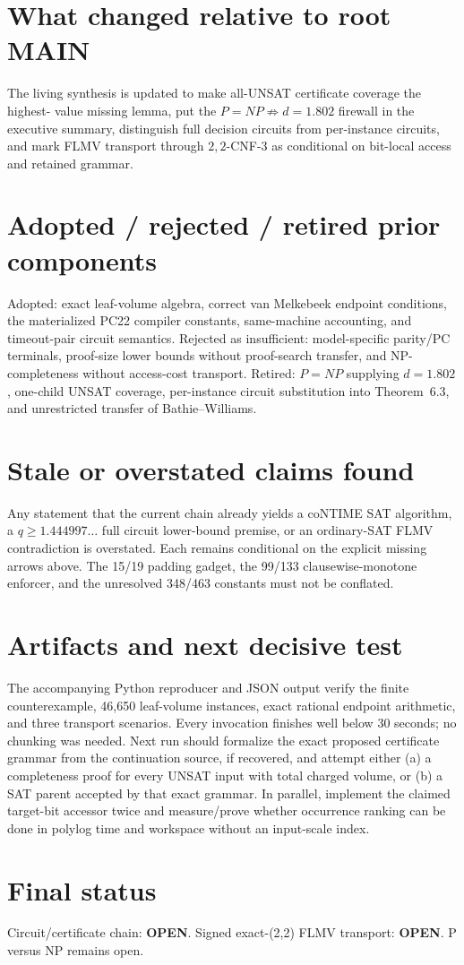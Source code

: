 \documentclass[11pt]{article}
\newcommand{\openstatus}{\textbf{OPEN}}
\begin{document}
\section*{What changed relative to root MAIN}
The living synthesis is updated to make all-UNSAT certificate coverage the highest-
value missing lemma, put the $P=NP\not\Rightarrow d=1.802$ firewall in the executive
summary, distinguish full decision circuits from per-instance circuits, and mark FLMV
transport through $2,2$-CNF-3 as conditional on bit-local access and retained grammar.

\section*{Adopted / rejected / retired prior components}
Adopted: exact leaf-volume algebra, correct van Melkebeek endpoint conditions, the
materialized PC22 compiler constants, same-machine accounting, and timeout-pair circuit
semantics.  Rejected as insufficient: model-specific parity/PC terminals, proof-size
lower bounds without proof-search transfer, and NP-completeness without access-cost
transport.  Retired: $P=NP$ supplying $d=1.802$, one-child UNSAT coverage, per-instance
circuit substitution into Theorem~6.3, and unrestricted transfer of Bathie--Williams.

\section*{Stale or overstated claims found}
Any statement that the current chain already yields a coNTIME SAT algorithm, a
$q\ge1.444997\ldots$ full circuit lower-bound premise, or an ordinary-SAT FLMV
contradiction is overstated.  Each remains conditional on the explicit missing arrows
above.  The 15/19 padding gadget, the 99/133 clausewise-monotone enforcer, and the
unresolved 348/463 constants must not be conflated.

\section*{Artifacts and next decisive test}
The accompanying Python reproducer and JSON output verify the finite counterexample,
46,650 leaf-volume instances, exact rational endpoint arithmetic, and three transport
scenarios.  Every invocation finishes well below 30 seconds; no chunking was needed.
Next run should formalize the exact proposed certificate grammar from the continuation
source, if recovered, and attempt either (a) a completeness proof for every UNSAT input
with total charged volume, or (b) a SAT parent accepted by that exact grammar.  In
parallel, implement the claimed target-bit accessor twice and measure/prove whether
occurrence ranking can be done in polylog time and workspace without an input-scale
index.

\section*{Final status}
Circuit/certificate chain: \openstatus.  Signed exact-(2,2) FLMV transport:
\openstatus.  P versus NP remains open.

\end{document}
